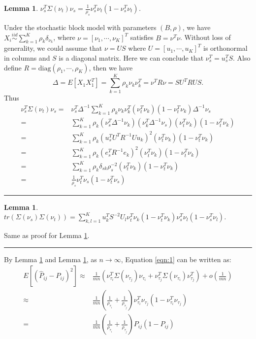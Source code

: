 \documentclass[a4paper]{article}
\newenvironment{proof}{{\bf Proof:  }}{\hfill\rule{2mm}{2mm}}
\newtheorem{lemma}[fact]{Lemma}
\begin{document}
\begin{lemma}
\label{lemma:1}
$\nu_s^T \Sigma(\nu_t) \nu_s = \frac{1}{\rho_s} \nu_s^T \nu_t (1- \nu_s^T \nu_t)$.
\end{lemma}
\begin{proof}
Under the stochastic block model with parameters $(B, \rho)$, we have $X_i \stackrel{iid}{\sim} \sum_{k=1}^K \rho_k \delta_{\nu_k}$, where $\nu = [\nu_1, \cdots, \nu_K]^T$ satisfies $B = \nu^T \nu$. Without loss of generality, we could assume that $\nu = U S$ where $U = [u_1, \cdots, u_K]^T$ is orthonormal in columns and $S$ is a diagonal matrix. Here we can conclude that $\nu_s^T = u_s^T S$. Also define $R = \text{diag}(\rho_1, \cdots, \rho_K)$, then we have
\[
	\Delta = E[X_1 X_1^T] = \sum_{k=1}^K \rho_k \nu_k \nu_k^T = \nu^T R \nu = S U^T R U S.
\]
Thus
\begin{align*}
	\nu_s^T \Sigma(\nu_t) \nu_s = &
    \nu_s^T \Delta^{-1} \sum_{k=1}^K \rho_k \nu_k \nu_k^T (\nu_t^T \nu_k)(1 - \nu_t^T \nu_k) \Delta^{-1} \nu_s \\
    = & \sum_{k=1}^K \rho_k (\nu_s^T \Delta^{-1} \nu_k) (\nu_k^T \Delta^{-1} \nu_s) (\nu_t^T \nu_k) (1 - \nu_t^T \nu_k) \\
    = & \sum_{k=1}^K \rho_k (u_s^T U^T R^{-1} U u_k)^2 (\nu_t^T \nu_k) (1 - \nu_t^T \nu_k) \\
    = & \sum_{k=1}^K \rho_k (e_s^T R^{-1} e_k)^2 (\nu_t^T \nu_k) (1 - \nu_t^T \nu_k) \\
    = & \sum_{k=1}^K \rho_k \delta_{sk} \rho_s^{-2} (\nu_t^T \nu_k) (1 - \nu_t^T \nu_k) \\
    = & \frac{1}{\rho_s} \nu_t^T \nu_s (1 - \nu_t^T \nu_s)
\end{align*}
\end{proof}



\begin{lemma}
\label{lemma:2}
$tr(\Sigma(\nu_s) \Sigma(\nu_t)) = \sum_{k,l=1}^K u_k^T S^{-2} U_l \nu_t^T \nu_k (1 - \nu_t^T \nu_k) \nu_s^T \nu_l (1-\nu_s^T \nu_l)$.
\end{lemma}
\begin{proof}
Same as proof for Lemma \ref{lemma:1}.
\end{proof}


By Lemma \ref{lemma:1} and Lemma \ref{lemma:2}, as $n \rightarrow \infty$, Equation \ref{eqn:1} can be written as:
\begin{align}
	E[(\hat{P}_{ij} - P_{ij})^2] \approx &
    \frac{1}{m n} \left( \nu_{\tau_i}^T \Sigma(\nu_{\tau_j}) \nu_{\tau_i} + \nu_{\tau_j}^T \Sigma(\nu_{\tau_i}) \nu_{\tau_j}^T \right) 
    + o(\frac{1}{m n}) \\
    \approx & \frac{1}{mn} \left( \frac{1}{\rho_{\tau_i}} + \frac{1}{\rho_{\tau_j}} \right) \nu_{\tau_i}^T \nu_{\tau_j} (1-\nu_{\tau_i}^T \nu_{\tau_j}) \\
    = & \frac{1}{mn} \left( \frac{1}{\rho_{\tau_i}} + \frac{1}{\rho_{\tau_j}} \right) P_{ij} (1 - P_{ij})
    \label{eqn:2}
\end{align}
\end{document}
